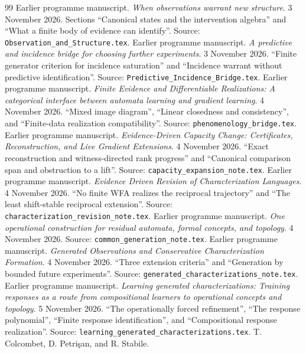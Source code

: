 \documentclass[11pt]{article}
\theoremstyle{definition}
\theoremstyle{remark}\newtheorem{remark}[theorem]{Remark}
\begin{document}
\begin{thebibliography}{99}
 Earlier programme manuscript.
\emph{When observations warrant new structure}. 3 November 2026.
Sections ``Canonical states and the intervention algebra'' and
``What a finite body of evidence can identify''.
Source: \texttt{Observation\_and\_Structure.tex}.
 Earlier programme manuscript.
\emph{A predictive and incidence bridge for choosing further experiments}.
3 November 2026. ``Finite generator criterion for incidence saturation''
and ``Incidence warrant without predictive identification''.
Source: \texttt{Predictive\_Incidence\_Bridge.tex}.
 Earlier programme manuscript.
\emph{Finite Evidence and Differentiable Realizations: A categorical
interface between automata learning and gradient learning}.
4 November 2026. ``Mixed image diagram'', ``Linear closedness and
consistency'', and ``Finite-data realization compatibility''.
Source: \texttt{phenomenology\_bridge.tex}.
 Earlier programme manuscript.
\emph{Evidence-Driven Capacity Change: Certificates, Reconstruction, and
Live Gradient Extensions}. 4 November 2026.
``Exact reconstruction and witness-directed rank progress'' and
``Canonical comparison span and obstruction to a lift''.
Source: \texttt{capacity\_expansion\_note.tex}.
 Earlier programme manuscript.
\emph{Evidence Driven Revision of Characterization Languages}.
4 November 2026. ``No finite WFA realizes the reciprocal trajectory'' and
``The least shift-stable reciprocal extension''.
Source: \texttt{characterization\_revision\_note.tex}.
 Earlier programme manuscript.
\emph{One operational construction for residual automata, formal concepts,
and topology}. 4 November 2026.
Source: \texttt{common\_generation\_note.tex}.
 Earlier programme manuscript.
\emph{Generated Observations and Conservative Characterization Formation}.
4 November 2026. ``Three extension criteria'' and ``Generation by bounded
future experiments''.
Source: \texttt{generated\_characterizations\_note.tex}.
 Earlier programme manuscript.
\emph{Learning generated characterizations: Training responses as a route
from compositional learners to operational concepts and topology}.
5 November 2026. ``The operationally forced refinement'', ``The response
polynomial'', ``Finite response identification'', and ``Compositional
response realization''.
Source: \texttt{learning\_generated\_characterizations.tex}.
 T. Colcombet, D. Petri\c{s}an, and R. Stabile.

\end{thebibliography}
\end{document}
